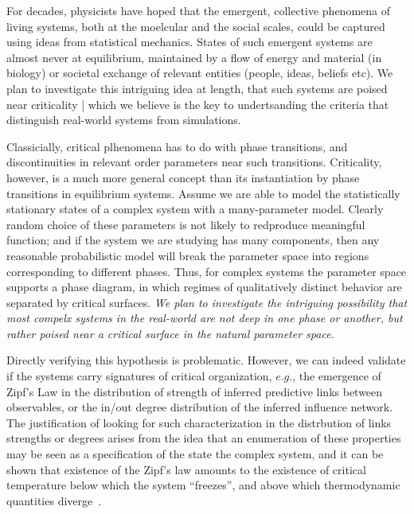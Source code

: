 \documentclass[onecolumn, compsoc,11pt]{IEEEtran}
\begin{document}
For decades, physicists have hoped that the emergent, collective phenomena of living systems, both at the moelcular and the social scales, could be captured using ideas from statistical mechanics. States of such  emergent systems are almost never at equilibrium, maintained by a flow of energy and material (in biology) or societal exchange of relevant entities (people, ideas, beliefs etc). We plan to investigate this intriguing idea at length, that such systems are poised near criticality | which we believe is the key to undertsanding the criteria that distinguish real-world systems from simulations.

Classicially, critical plhenomena has to do with phase transitions, and discontinuities in relevant order parameters near such transitions. 
Criticality, however, is a much more general concept than its instantiation by phase transitions in equilibrium systems. Assume we are able to model the statistically stationary states of a complex system  with a many-parameter model. Clearly random choice of these parameters is not likely to redproduce meaningful function; and  if the system we are studying has many components, then any reasonable probabilistic model will break the parameter space into regions corresponding to different phases. Thus, for complex systems the parameter space supports a phase diagram, in which regimes of qualitatively distinct behavior are separated  by critical surfaces. \textit{We plan to investigate the  intriguing possibility  that most compelx systems in the real-world are not deep in one phase or another, but rather poised near a critical surface in the natural parameter space.} 

\def\q{\sigma}

Directly verifying this hypothesis is problematic. However, we can indeed validate if the systems carry signatures of critical organization, $e.g.$, the emergence of Zipf's Law in the distribution of
strength of inferred predictive links between observables, or the in/out degree distribution of the inferred influence network.
The justification of looking for such characterization in the distrbution of links strengths or degrees  arises from the idea that an enumeration of these properties may be seen as a specification of the state  the complex system, and it can be shown that existence of the Zipf's law amounts to the existence of critical temperature below which the system ``freezes'', and above which thermodynamic quantities diverge~\cite{mora2011biological}.
\end{document}
